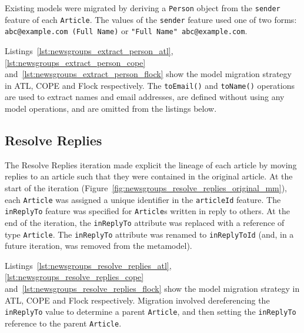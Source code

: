 
Existing models were migrated by deriving a \texttt{Pe\-rs\-on} object from the \texttt{se\-nd\-er} feature of each \texttt{Ar\-ti\-c\-le}. The values of the \texttt{se\-nd\-er} feature used one of two forms: \texttt{abc@example.com (Full Name)} or \texttt{"Full Name" abc@example.com}.

Listings~\ref{lst:newsgroups_extract_person_atl}, \ref{lst:newsgroups_extract_person_cope} and~\ref{lst:newsgroups_extract_person_flock} show the model migration strategy in ATL, COPE and Flock respectively. The \texttt{toEmail()} and \texttt{toName()} operations are used to extract names and email addresses, are defined without using any model operations, and are omitted from the listings below.


\subsection{Resolve Replies}
The Resolve Replies iteration made explicit the lineage of each article by moving replies to an article such that they were contained in the original article. At the start of the iteration (Figure~\ref{fig:newsgroups_resolve_replies_original_mm}), each \texttt{Article} was assigned a unique identifier in the \texttt{articleId} feature. The \texttt{inReplyTo} feature was specified for \texttt{Article}s written in reply to others. At the end of the iteration, the \texttt{inReplyTo} attribute was replaced with a reference of type \texttt{Article}. The \texttt{inReplyTo} attribute was renamed to \texttt{inReplyToId} (and, in a future iteration, was removed from the metamodel).


Listings~\ref{lst:newsgroups_resolve_replies_atl}, \ref{lst:newsgroups_resolve_replies_cope} and~\ref{lst:newsgroups_resolve_replies_flock} show the model migration strategy in ATL, COPE and Flock respectively. Migration involved dereferencing the \texttt{inRe\-p\-lyTo} value to determine a parent \texttt{Article}, and then setting the \texttt{inReplyTo} reference to the parent \texttt{Article}.



